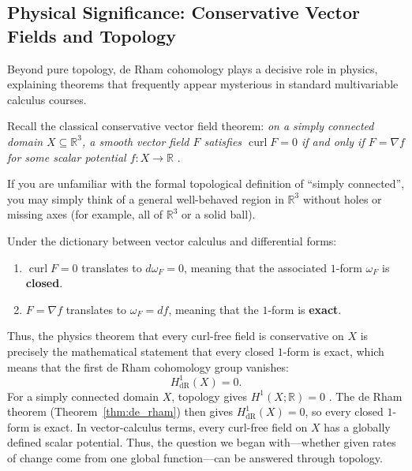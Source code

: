 \subsection{Physical Significance: Conservative Vector Fields and Topology}
Beyond pure topology, de Rham cohomology plays a decisive role in physics,
explaining theorems that frequently appear mysterious in standard
multivariable calculus courses.

Recall the classical conservative vector field theorem: \emph{on a simply
connected domain $X \subseteq \mathbb{R}^3$, a smooth vector field $F$
satisfies $\operatorname{curl} F = 0$ if and only if $F = \nabla f$ for some
scalar potential $f \colon X \to \mathbb{R}$}
\cite[Corollary~16.27, p.~421]{lee2013smooth}.

\begin{remark}
    If you are unfamiliar with the formal topological definition of ``simply
    connected'', you may simply think of a general well-behaved region in
    $\mathbb{R}^3$ without holes or missing axes (for example, all of
    $\mathbb{R}^3$ or a solid ball).
\end{remark}

Under the dictionary between vector calculus and differential forms:
\begin{enumerate}
    \item $\operatorname{curl} F = 0$ translates to $d\omega_F = 0$, meaning
        that the associated $1$-form $\omega_F$ is \textbf{closed}.
    \item $F = \nabla f$ translates to $\omega_F = df$, meaning that the
        $1$-form is \textbf{exact}.
\end{enumerate}

Thus, the physics theorem that every curl-free field is conservative on $X$ is
precisely the mathematical statement that every closed $1$-form is exact,
which means that the first de Rham cohomology group vanishes:
\begin{equation}
    H^1_{\mathrm{dR}}(X) = 0.
\end{equation}
For a simply connected domain $X$, topology gives $H^1(X; \mathbb{R}) = 0$
\cite[p.~472; Problem~18-2, p.~487]{lee2013smooth}.
The de Rham theorem (Theorem~\ref{thm:de_rham}) then gives
$H^1_{\mathrm{dR}}(X) = 0$, so every closed $1$-form is exact. In
vector-calculus terms, every curl-free field on $X$ has a globally defined
scalar potential. Thus, the question we began with---whether given rates of
change come from one global function---can be answered through topology.
